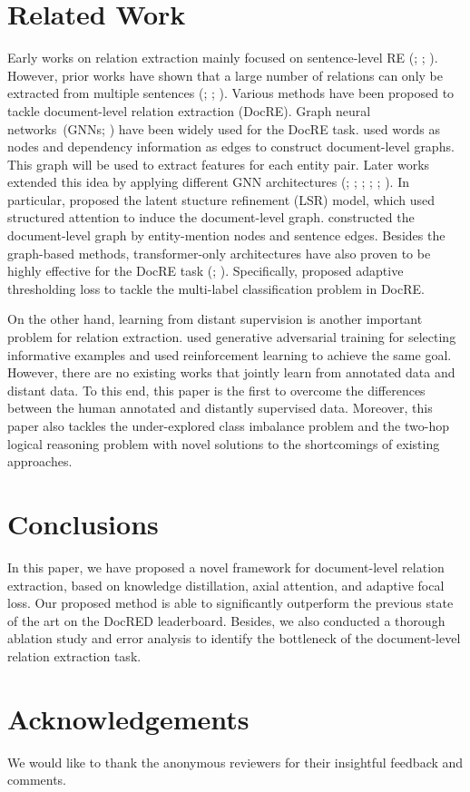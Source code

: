 \documentclass[11pt]{article}
\begin{document}
\section{Related Work}
Early works on relation extraction mainly focused on sentence-level RE (\citealp{zhang-etal-2017-position}; \citealp{baldini-soares-etal-2019-matching}; \citealp{peng2020learning}). However, prior works have shown that a large number of relations can only be extracted from multiple sentences (\citealp{verga-etal-2018-simultaneously}; \citealp{yao2019docred}; \citealp{cheng-etal-2021-hacred}). Various methods have been proposed to tackle document-level relation extraction (DocRE). Graph neural networks~(GNNs; \citealp{scarselli2008graph}) have been widely used for the DocRE task. \citet{quirk-poon-2017-distant} used words as nodes and dependency information as edges to construct document-level graphs. This graph will be used to extract features for each entity pair. Later works extended this idea by applying different GNN architectures (\citealp{peng2017cross}; \citealp{verga-etal-2018-simultaneously}; \citealp{christopoulou-etal-2019-connecting}; \citealp{nan-etal-2020-reasoning}; \citealp{zhang-etal-2018-graph}; \citealp{zeng2020double}). In particular, \citet{nan-etal-2020-reasoning} proposed the latent stucture refinement (LSR) model, which used structured attention to induce the document-level graph. \citet{zeng2020double} constructed the document-level graph by entity-mention nodes and sentence edges. Besides the graph-based methods, transformer-only architectures have also proven to be highly effective for the DocRE task (\citealp{tang2020hin}; \citealp{zhou2021document}). Specifically, \citet{zhou2021document} proposed adaptive thresholding loss to tackle the multi-label classification problem in DocRE.

On the other hand, learning from distant supervision is another important problem for relation extraction. \citet{qin-etal-2018-dsgan} used generative adversarial training for selecting informative examples and \citet{feng2018reinforcement} used reinforcement learning to achieve the same goal. However, there are no existing works that jointly learn from annotated data and distant data. To this end, this paper is the first to overcome the differences between the human annotated and distantly supervised data. Moreover, this paper also tackles the under-explored class imbalance problem and the two-hop logical reasoning problem with novel solutions to the shortcomings of existing approaches. 
\section{Conclusions}
In this paper, we have proposed a novel framework for document-level relation extraction, based on knowledge distillation, axial attention, and adaptive focal loss. Our proposed method is able to significantly outperform the previous state of the art on the DocRED leaderboard. Besides, we also conducted a thorough ablation study and error analysis to identify the bottleneck of the document-level relation extraction task.

\section{Acknowledgements}
We would like to thank the anonymous reviewers for their insightful feedback and comments.




\end{document}
